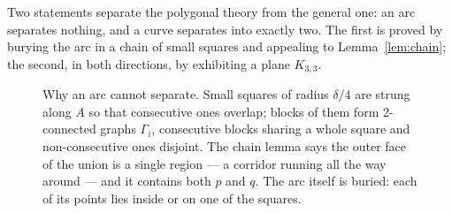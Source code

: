 \documentclass[11pt,a4paper]{article}
\theoremstyle{jsplain}
\theoremstyle{jsdefn}
\begin{document}
Two statements separate the polygonal theory from the general one: an arc
separates nothing, and a curve separates into exactly two. The first is
proved by burying the arc in a chain of small squares and appealing to
Lemma~\ref{lem:chain}; the second, in both directions, by exhibiting a
plane $K_{3,3}$.

\begin{figure}[t]
\centering
{}
\caption{Why an arc cannot separate. Small squares of radius $\delta/4$
are strung along $A$ so that consecutive ones overlap; blocks of them
form 2-connected graphs $\Gamma_i$, consecutive blocks sharing a whole
square and non-consecutive ones disjoint. The chain lemma says the outer
face of the union is a single region --- a corridor running all the way
around --- and it contains both $p$ and $q$. The arc itself is buried:
each of its points lies inside or on one of the
squares.}\label{fig:chain}
\end{figure}
\end{document}
